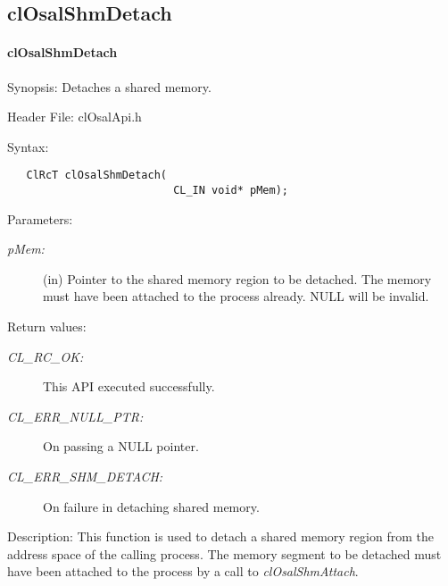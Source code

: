 \subsection{clOsalShmDetach} 
\hypertarget{pageosal149}{}\paragraph{cl\-Osal\-Shm\-Detach}\label{pageosal149}
\begin{Desc}
\item[Synopsis:]Detaches a shared memory.\end{Desc}
\begin{Desc}
\item[Header File:]clOsalApi.h\end{Desc}
\begin{Desc}
\item[Syntax:]

\footnotesize\begin{verbatim}   ClRcT clOsalShmDetach(
                          CL_IN void* pMem);
\end{verbatim}
\normalsize
\end{Desc}
\begin{Desc}
\item[Parameters:]
\begin{description}
\item[{\em p\-Mem:}](in) Pointer to the shared memory region to be detached. The memory must have been attached to the process already. NULL will be invalid.\end{description}
\end{Desc}
\begin{Desc}
\item[Return values:]
\begin{description}
\item[{\em CL\_\-RC\_\-OK:}]This API executed successfully. \item[{\em CL\_\-ERR\_\-NULL\_\-PTR:}]On passing a NULL pointer. \item[{\em CL\_\-ERR\_\-SHM\_\-DETACH:}]On failure in detaching shared memory.\end{description}
\end{Desc}
\begin{Desc}
\item[Description:]This function is used to detach a shared memory region from the address space of the calling process. The memory segment to be detached must have been attached to the process by a call to {\em cl\-Osal\-Shm\-Attach\/}.\end{Desc}

